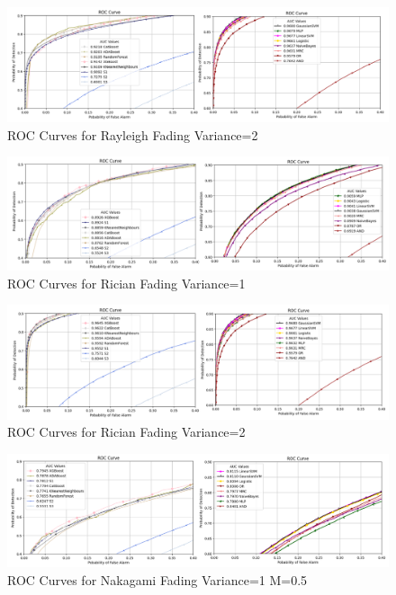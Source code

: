 \begin{figure}
  \begin{center}
  \includegraphics[width=1\textwidth]{figs/3.png}
  \end{center}
  \caption{ROC Curves for Rayleigh Fading Variance=2}
\end{figure}

\begin{figure}
  \begin{center}
  \includegraphics[width=1\textwidth]{figs/4.png}
  \end{center}
  \caption{ROC Curves for Rician Fading Variance=1}
\end{figure}

\begin{figure}
  \begin{center}
  \includegraphics[width=1\textwidth]{figs/5.png}
  \end{center}
  \caption{ROC Curves for Rician Fading Variance=2}
\end{figure}

\begin{figure}
  \begin{center}
  \includegraphics[width=1\textwidth]{figs/6.png}
  \end{center}
  \caption{ROC Curves for Nakagami Fading Variance=1 M=0.5}
\end{figure}

